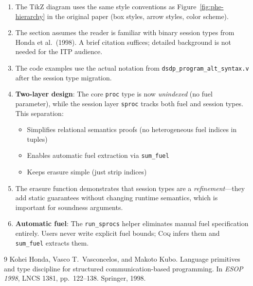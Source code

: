\documentclass[11pt]{article}
\newcommand{\coqin}[1]{\texttt{#1}}
\newcommand{\coq}{\textsc{Coq}}
\begin{document}
\begin{enumerate}
  \item The TikZ diagram uses the same style conventions as
        Figure~\ref{fig:phe-hierarchy} in the original paper (box styles,
        arrow styles, color scheme).
  
  \item The section assumes the reader is familiar with binary session types
        from Honda et al.\ (1998). A brief citation suffices; detailed
        background is not needed for the ITP audience.
  
  \item The code examples use the actual notation from
        \texttt{dsdp\_program\_alt\_syntax.v} after the session type migration.
  
  \item \textbf{Two-layer design}: The core \coqin{proc} type is now
        \emph{unindexed} (no fuel parameter), while the session layer
        \coqin{sproc} tracks both fuel and session types. This separation:
        \begin{itemize}
          \item Simplifies relational semantics proofs (no heterogeneous
                fuel indices in tuples)
          \item Enables automatic fuel extraction via \coqin{sum\_fuel}
          \item Keeps erasure simple (just strip indices)
        \end{itemize}
  
  \item The erasure function demonstrates that session types are a
        \emph{refinement}---they add static guarantees without changing
        runtime semantics, which is important for soundness arguments.
  
  \item \textbf{Automatic fuel}: The \coqin{run\_sprocs} helper eliminates
        manual fuel specification entirely. Users never write explicit fuel
        bounds; \coq{} infers them and \coqin{sum\_fuel} extracts them.
\end{enumerate}


\begin{thebibliography}{9}
Kohei Honda, Vasco T.\ Vasconcelos, and Makoto Kubo.
\newblock Language primitives and type discipline for structured
  communication-based programming.
\newblock In \emph{ESOP 1998}, LNCS 1381, pp.\ 122--138. Springer, 1998.
\end{thebibliography}
\end{document}
